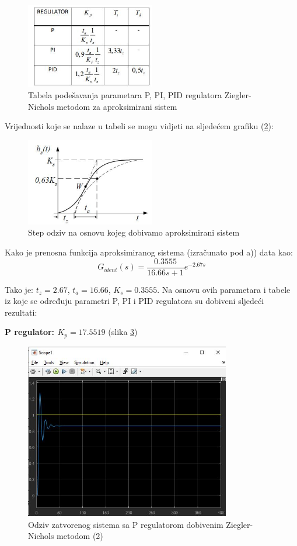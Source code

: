 \begin{figure} [H]
  \centering
  \includegraphics[width=0.5\textwidth]{z1_16}
  \caption{Tabela podešavanja parametara P, PI, PID regulatora Ziegler-Nichols metodom za aproksimirani sistem}
  \label{fig:z1_16}
\end{figure}

Vrijednosti koje se nalaze u tabeli se mogu vidjeti na sljedećem grafiku (\ref{fig:z1_17}):
 
 \begin{figure} [H]
  \centering
  \includegraphics[width=0.5\textwidth]{z1_17}
  \caption{Step odziv na osnovu kojeg dobivamo aproksimirani sistem}
  \label{fig:z1_17}
\end{figure}

Kako je prenosna funkcija aproksimiranog sistema (izračunato pod a)) data kao:
	\[G_{ident} (s)=\frac{0.3555}{16.66s+1} e^{-2.67s} \]

Tako je: $t_z=2.67$, $t_a=16.66$, $K_s=0.3555$. Na osnovu ovih parametara i tabele iz koje se određuju parametri P, PI i PID regulatora su dobiveni sljedeći rezultati:

\textbf{P regulator: $K_p=17.5519$} (slika \ref{fig:z1_18})
 
\begin{figure} [H]
  \centering
  \includegraphics[width=0.8\textwidth]{z1_18}
  \caption{Odziv zatvorenog sistema sa P regulatorom dobivenim Ziegler-Nichols metodom (2)}
  \label{fig:z1_18}
\end{figure} 

